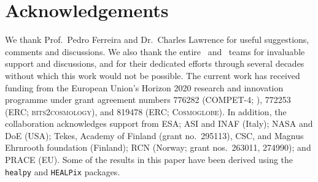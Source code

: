 \section*{Acknowledgements}
{\small
  We thank Prof.\ Pedro Ferreira and Dr.\ Charles Lawrence 
  for useful suggestions, comments and 
  discussions. We also thank the entire \Planck\ and \WMAP\ teams for
  invaluable support and discussions, and for their dedicated efforts
  through several decades without which this work would not be
  possible. The current work has received funding from the European
  Union’s Horizon 2020 research and innovation programme under grant
  agreement numbers 776282 (COMPET-4; \BP), 772253 (ERC;
  \textsc{bits2cosmology}), and 819478 (ERC; \textsc{Cosmoglobe}). In
  addition, the collaboration acknowledges support from ESA; ASI and
  INAF (Italy); NASA and DoE (USA); Tekes, Academy of Finland (grant
   no.\ 295113), CSC, and Magnus Ehrnrooth foundation (Finland); RCN
  (Norway; grant nos.\ 263011, 274990); and PRACE (EU). Some of the results 
  in this paper have been derived using the \texttt{healpy} \citep{zonca2019} 
  and \texttt{HEALPix} \citep{gorski2005} packages.
}
